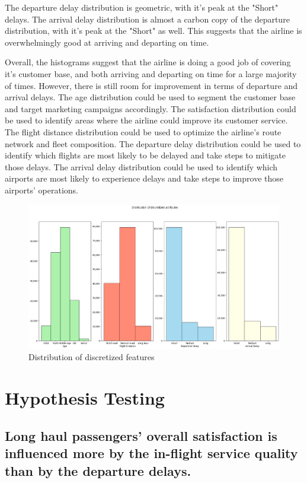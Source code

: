 \documentclass[11pt]{article}
\begin{document}
The departure delay distribution is geometric, with it's peak at the "Short" delays. The arrival delay distribution is almost a carbon copy of the departure distribution, with it's peak at the "Short" as well. This suggests that the airline is overwhelmingly good at arriving and departing on time.

Overall, the histograms suggest that the airline is doing a good job of covering it's customer base, and both arriving and departing on time for a large majority of times. However, there is still room for improvement in terms of departure and arrival delays. The age distribution could be used to segment the customer base and target marketing campaigns accordingly. The satisfaction distribution could be used to identify areas where the airline could improve its customer service. The flight distance distribution could be used to optimize the airline's route network and fleet composition. The departure delay distribution could be used to identify which flights are most likely to be delayed and take steps to mitigate those delays. The arrival delay distribution could be used to identify which airports are most likely to experience delays and take steps to improve those airports' operations.


    \begin{figure}[h]
\centering
\includegraphics[width=0.7\linewidth]{project_files/project_20_1.png}
\caption{Distribution of discretized features}
\end{figure}

        
    \hypertarget{question-3}{%
\section{Hypothesis Testing}\label{question-3}}

\subsection{Long haul passengers’ overall satisfaction is influenced more by the in-flight service quality than by the departure delays.}
\end{document}
